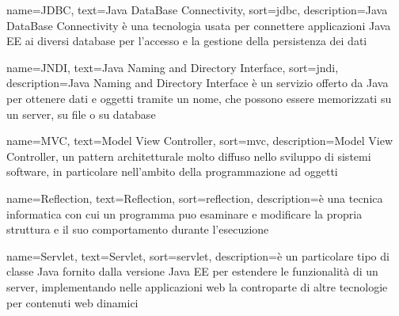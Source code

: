 {
    name=JDBC,
    text=Java DataBase Connectivity,
    sort=jdbc,
    description={Java DataBase Connectivity è una tecnologia usata per connettere applicazioni Java EE ai diversi database per l'accesso e la gestione della persistenza dei dati}
}


{
    name=JNDI,
    text=Java Naming and Directory Interface,
    sort=jndi,
    description={Java Naming and Directory Interface è un servizio offerto da Java per ottenere dati e oggetti tramite un nome, che possono essere memorizzati su un server, su file o su database}
}

{
    name=MVC,
    text=Model View Controller,
    sort=mvc,
    description={Model View Controller, un pattern architetturale molto diffuso nello sviluppo di sistemi software, in particolare nell’ambito della programmazione ad oggetti}
}

{
    name=Reflection,
    text=Reflection,
    sort=reflection,
    description={è una tecnica informatica con cui un programma puo esaminare e modificare la propria struttura e il suo comportamento durante l'esecuzione}
}

{
    name=Servlet,
    text=Servlet,
    sort=servlet,
    description={è un particolare tipo di classe Java fornito dalla versione Java EE per estendere le funzionalità di un server, implementando nelle applicazioni web la controparte	di altre tecnologie per contenuti web dinamici}
}